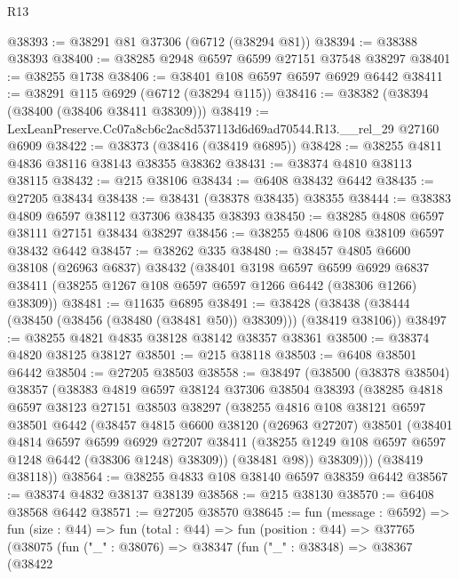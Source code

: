 \begin{lexlean}{R13}
\begin{coremodule}
@38393 := @38291 @81 @37306 (@6712 (@38294 @81))
@38394 := @38388 @38393
@38400 := @38285 @2948 @6597 @6599 @27151 @37548 @38297
@38401 := @38255 @1738
@38406 := @38401 @108 @6597 @6597 @6929 @6442
@38411 := @38291 @115 @6929 (@6712 (@38294 @115))
@38416 := @38382 (@38394 (@38400 (@38406 @38411 @38309)))
@38419 := LexLeanPreserve.Cc07a8cb6c2ac8d537113d6d69ad70544.R13.__rel_29 @27160 @6909
@38422 := @38373 (@38416 (@38419 @6895))
@38428 := @38255 @4811 @4836 @38116 @38143 @38355 @38362
@38431 := @38374 @4810 @38113 @38115
@38432 := @215 @38106
@38434 := @6408 @38432 @6442
@38435 := @27205 @38434
@38438 := @38431 (@38378 @38435) @38355
@38444 := @38383 @4809 @6597 @38112 @37306 @38435 @38393
@38450 := @38285 @4808 @6597 @38111 @27151 @38434 @38297
@38456 := @38255 @4806 @108 @38109 @6597 @38432 @6442
@38457 := @38262 @335
@38480 := @38457
    @4805
    @6600
    @38108
    (@26963 @6837)
    @38432
    (@38401
      @3198
      @6597
      @6599
      @6929
      @6837
      @38411
      (@38255 @1267 @108 @6597 @6597 @1266 @6442 (@38306 @1266) @38309))
@38481 := @11635 @6895
@38491 := @38428 (@38438 (@38444 (@38450 (@38456 (@38480 (@38481 @50)) @38309))) (@38419 @38106))
@38497 := @38255 @4821 @4835 @38128 @38142 @38357 @38361
@38500 := @38374 @4820 @38125 @38127
@38501 := @215 @38118
@38503 := @6408 @38501 @6442
@38504 := @27205 @38503
@38558 := @38497
    (@38500
      (@38378 @38504)
      @38357
      (@38383
        @4819
        @6597
        @38124
        @37306
        @38504
        @38393
        (@38285
          @4818
          @6597
          @38123
          @27151
          @38503
          @38297
          (@38255
            @4816
            @108
            @38121
            @6597
            @38501
            @6442
            (@38457
              @4815
              @6600
              @38120
              (@26963 @27207)
              @38501
              (@38401
                @4814
                @6597
                @6599
                @6929
                @27207
                @38411
                (@38255 @1249 @108 @6597 @6597 @1248 @6442 (@38306 @1248) @38309))
              (@38481 @98))
            @38309)))
      (@38419 @38118))
@38564 := @38255 @4833 @108 @38140 @6597 @38359 @6442
@38567 := @38374 @4832 @38137 @38139
@38568 := @215 @38130
@38570 := @6408 @38568 @6442
@38571 := @27205 @38570
@38645 := fun (message : @6592) =>
  fun (size : @44) =>
  fun (total : @44) =>
  fun (position : @44) =>
  @37765
    (@38075
      (fun ("_" : @38076) =>
      @38347
        (fun ("_" : @38348) =>
        @38367
          (@38422

\end{coremodule}
\end{lexlean}
